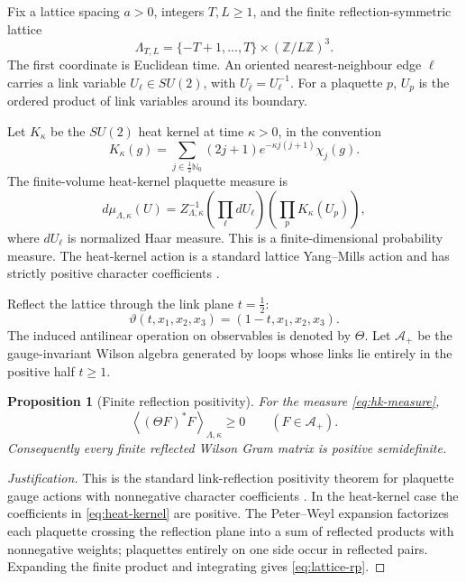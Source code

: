 \documentclass[11pt]{article}
\newtheorem{proposition}[theorem]{Proposition}
\begin{document}
Fix a lattice spacing $a>0$, integers $T,L\ge1$, and the finite reflection-symmetric lattice
\begin{equation}
  \Lambda_{T,L}
  =\{-T+1,\ldots,T\}\times(\mathbb Z/L\mathbb Z)^3.
  \label{eq:lattice}
\end{equation}
The first coordinate is Euclidean time.  An oriented nearest-neighbour edge $\ell$ carries a link variable $U_\ell\in SU(2)$, with $U_{\bar\ell}=U_\ell^{-1}$.  For a plaquette $p$, $U_p$ is the ordered product of link variables around its boundary.

Let $K_\kappa$ be the $SU(2)$ heat kernel at time $\kappa>0$, in the convention
\begin{equation}
  K_\kappa(g)
  =\sum_{j\in\frac12\mathbb N_0}
  (2j+1)e^{-\kappa j(j+1)}\chi_j(g).
  \label{eq:heat-kernel}
\end{equation}
The finite-volume heat-kernel plaquette measure is
\begin{equation}
  d\mu_{\Lambda,\kappa}(U)
  =Z_{\Lambda,\kappa}^{-1}
  \left(\prod_{\ell}dU_\ell\right)
  \left(\prod_p K_\kappa(U_p)\right),
  \label{eq:hk-measure}
\end{equation}
where $dU_\ell$ is normalized Haar measure.  This is a finite-dimensional probability measure.  The heat-kernel action is a standard lattice Yang--Mills action and has strictly positive character coefficients \cite{MenottiOnofri1981}.

Reflect the lattice through the link plane $t=\tfrac12$:
\begin{equation}
  \vartheta(t,x_1,x_2,x_3)=(1-t,x_1,x_2,x_3).
  \label{eq:time-reflection}
\end{equation}
The induced antilinear operation on observables is denoted by $\Theta$.  Let $\mathcal A_+$ be the gauge-invariant Wilson algebra generated by loops whose links lie entirely in the positive half $t\ge1$.

\begin{proposition}[Finite reflection positivity]
\label{prop:lattice-rp}
For the measure \eqref{eq:hk-measure},
\begin{equation}
  \left\langle(\Theta F)^*F\right\rangle_{\Lambda,\kappa}\ge0
  \qquad(F\in\mathcal A_+).
  \label{eq:lattice-rp}
\end{equation}
Consequently every finite reflected Wilson Gram matrix is positive semidefinite.
\end{proposition}

\begin{proof}[Justification]
This is the standard link-reflection positivity theorem for plaquette gauge actions with nonnegative character coefficients \cite{OsterwalderSeiler1978,Luscher1977}.  In the heat-kernel case the coefficients in \eqref{eq:heat-kernel} are positive.  The Peter--Weyl expansion factorizes each plaquette crossing the reflection plane into a sum of reflected products with nonnegative weights; plaquettes entirely on one side occur in reflected pairs.  Expanding the finite product and integrating gives \eqref{eq:lattice-rp}.
\end{proof}
\end{document}
